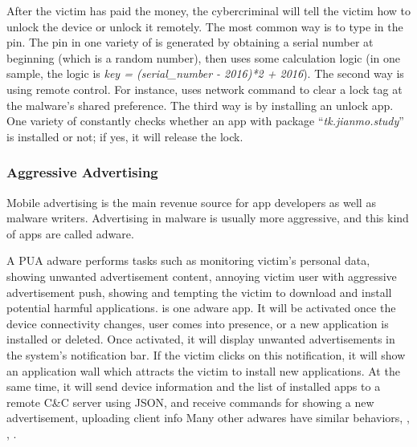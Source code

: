 \vspace{-.05in}

After the victim has paid the money, the cybercriminal will tell the victim 
how to unlock the device or unlock it remotely.
The most common way is to type in the pin. 
The pin in one variety of  is generated by
obtaining a serial number at beginning (which is a random number),
then uses some calculation logic (in one sample, the logic is {\em key = (serial_number - 2016)*2 + 2016}).
The second way is using remote control.
For instance,  uses network command to clear a lock tag at the malware's shared preference.
The third way is by installing an unlock app.
One variety of  constantly checks whether an app with package
``{\em tk.jianmo.study}'' is installed or not; if yes, it will release the lock.

\vspace{-.2in}
\subsubsection{Aggressive Advertising}
\label{sec:profile:monetize:adware}

Mobile advertising is the main revenue source for app developers as well as
malware writers. Advertising in malware is usually more aggressive,
and this kind of apps are called adware.

\vspace{-.05in}
A PUA adware performs tasks such as monitoring victim's personal data,
showing unwanted advertisement content,
annoying victim user with aggressive advertisement push,
showing and tempting the victim to download and install potential harmful applications.
 is one adware app.
It will be activated once the device connectivity changes, 
user comes into presence,
or a new application is installed or deleted.
Once activated, it will display unwanted advertisements in the system's notification bar.
If the victim clicks on this notification, it will show an application wall which attracts
the victim to install new applications.
At the same time, it will send device information and the list of installed apps to a remote
C\&C server using JSON, and receive commands for showing a new advertisement,
uploading client info \etc
Many other adwares have similar behaviors, \eg {}, , .

